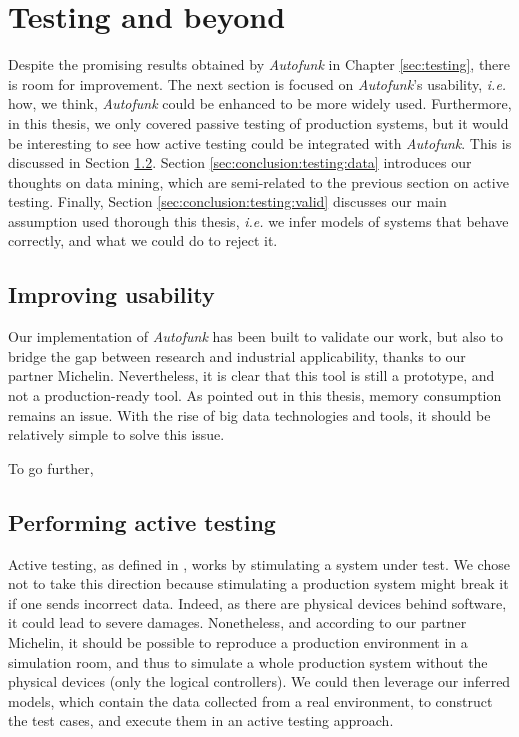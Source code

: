 \section{Testing and beyond}
\label{sec:conclusion:testing}

Despite the promising results obtained by \textit{Autofunk} in
Chapter \ref{sec:testing}, there is room for improvement. The
next section is focused on \textit{Autofunk}'s usability, \emph{i.e.}
how, we think, \textit{Autofunk} could be enhanced to be more
widely used. Furthermore, in this thesis, we only covered passive
testing of production systems, but it would be interesting to see
how active testing could be integrated with \textit{Autofunk}.
This is discussed in Section
\ref{sec:conclusion:testing:active}. Section
\ref{sec:conclusion:testing:data} introduces our thoughts on data
mining, which are semi-related to the previous section on active
testing. Finally, Section \ref{sec:conclusion:testing:valid}
discusses our main assumption used thorough this thesis, \emph{i.e.} we
infer models of systems that behave correctly, and what we could
do to reject it.


\subsection{Improving usability}

Our implementation of \textit{Autofunk} has been built to
validate our work, but also to bridge the gap between research
and industrial applicability, thanks to our partner Michelin.
Nevertheless, it is clear that this tool is still a prototype,
and not a production-ready tool. As pointed out in this thesis,
memory consumption remains an issue. With the rise of big data
technologies and tools, it should be relatively simple to solve
this issue.

To go further, 


\subsection{Performing active testing}
\label{sec:conclusion:testing:active}

Active testing, as defined in
,
works by stimulating a system under test. We chose not to take
this direction because stimulating a production system might
break it if one sends incorrect data. Indeed, as there are
physical devices behind software, it could lead to severe
damages.  Nonetheless, and according to our partner Michelin, it
should be possible to reproduce a production environment in a
simulation room, and thus to simulate a whole production system
without the physical devices (only the logical controllers). We
could then leverage our inferred models, which contain the data
collected from a real environment, to construct the test cases,
and execute them in an active testing approach.

